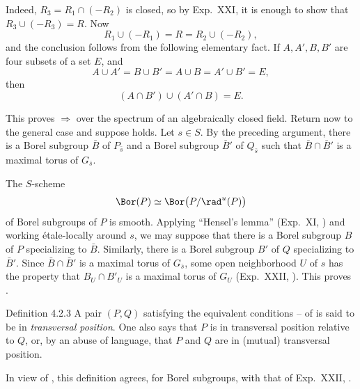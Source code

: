 Indeed, \(R_3=R_1\cap(-R_2)\) is closed, so by Exp.\ XXI,  it is
enough to show that \(R_3\cup(-R_3)=R\).  Now
\[
 R_1\cup(-R_1)=R=R_2\cup(-R_2),
\]
and the conclusion follows from the following elementary fact.  If
\(A,A',B,B'\) are four subsets of a set \(E\), and
\[
 A\cup A'=B\cup B'=A\cup B=A'\cup B'=E,
\]
then
\[
 (A\cap B')\cup(A'\cap B)=E.
\]

This proves \textup{} \(\Rightarrow\) \textup{} over the
spectrum of an algebraically closed field.  Return now to the general
case and suppose \textup{} holds.  Let \(s\in S\).  By the preceding
argument, there is a Borel subgroup \(\bar B\) of \(P_{\bar s}\) and a
Borel subgroup \(\bar B'\) of \(Q_{\bar s}\) such that
\(\bar B\cap\bar B'\) is a maximal torus of \(G_{\bar s}\).

The \(S\)-scheme
\[
 \Bor(P)\simeq\Bor\bigl(P/\rad^u(P)\bigr)
\]
of Borel subgroups of \(P\) is smooth.  Applying ``Hensel's lemma''
(Exp.\ XI, ) and working étale-locally around \(s\), we may suppose
that there is a Borel subgroup \(B\) of \(P\) specializing to
\(\bar B\).  Similarly, there is a Borel subgroup \(B'\) of \(Q\)
specializing to \(\bar B'\).  Since
\(\bar B\cap\bar B'\) is a maximal torus of \(G_{\bar s}\), some open
neighborhood \(U\) of \(s\) has the property that
\(B_U\cap B'_U\) is a maximal torus of \(G_U\)
(Exp.\ XXII, ).  This proves \textup{}.
\SGAQED

\begin{sgastatement}{Definition 4.2.3}
A pair \((P,Q)\) satisfying the equivalent conditions
\textup{}--\textup{} of  is said to be in
\emph{transversal position}.  One also says that \(P\) is in
transversal position relative to \(Q\), or, by an abuse of language,
that \(P\) and \(Q\) are in (mutual) transversal position.
\end{sgastatement}

In view of \textup{}, this definition agrees, for Borel subgroups,
with that of Exp.\ XXII, .

